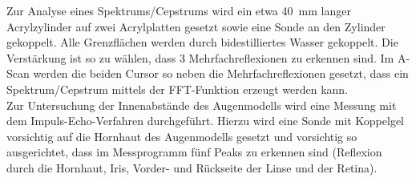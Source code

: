 Zur Analyse eines Spektrums/Cepstrums wird ein etwa \SI{40}{\milli\meter} langer Acrylzylinder auf zwei Acrylplatten gesetzt sowie eine Sonde an den Zylinder gekoppelt.
Alle Grenzflächen werden durch bidestilliertes Wasser gekoppelt. Die Verstärkung ist so zu wählen, dass 3 Mehrfachreflexionen zu erkennen sind.
Im A-Scan werden die beiden Cursor so neben die Mehrfachreflexionen gesetzt, dass ein Spektrum/Cepstrum mittels der FFT-Funktion erzeugt werden kann.\\
Zur Untersuchung der Innenabstände des Augenmodells wird eine Messung mit dem Impuls-Echo-Verfahren durchgeführt. Hierzu wird eine Sonde mit Koppelgel vorsichtig auf die Hornhaut des Augenmodells gesetzt und vorsichtig so ausgerichtet, dass im Messprogramm fünf Peaks zu erkennen sind (Reflexion durch die Hornhaut, Iris, Vorder- und Rückseite der Linse und der Retina).
